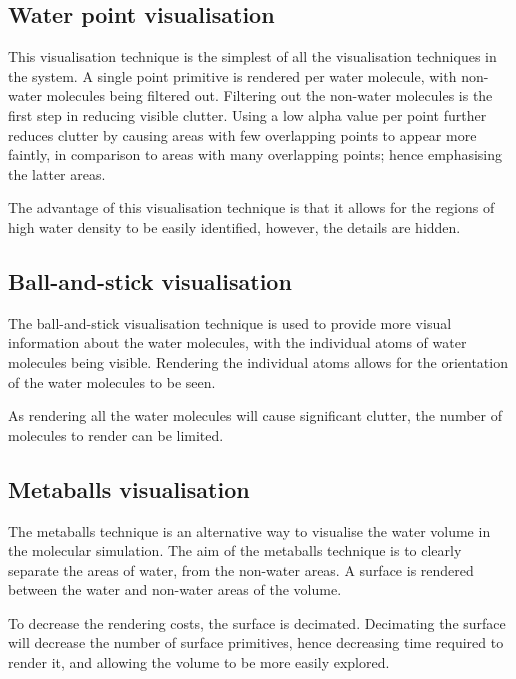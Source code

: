 
\subsection{Water point visualisation}
\label{sub:design_waterpoint}

This visualisation technique is the simplest of all the visualisation
techniques in the system. A single point primitive is rendered per water
molecule, with non-water molecules being filtered out. Filtering out the
non-water molecules is the first step in reducing visible clutter. Using a low
alpha value per point further reduces clutter by causing areas with few
overlapping points to appear more faintly, in comparison to areas with many
overlapping points; hence emphasising the latter areas.

The advantage of this visualisation technique is that it allows for the regions
of high water density to be easily identified, however, the details are hidden.


\subsection{Ball-and-stick visualisation}
\label{sub:design_ballstick}

The ball-and-stick visualisation technique is used to provide more visual
information about the water molecules, with the individual atoms of water
molecules being visible. Rendering the individual atoms allows for the
orientation of the water molecules to be seen.

As rendering all the water molecules will cause significant clutter, the number
of molecules to render can be limited.


\subsection{Metaballs visualisation}
\label{sub:design_metaballs}

The metaballs technique is an alternative way to visualise the water volume in
the molecular simulation. The aim of the metaballs technique is to clearly
separate the areas of water, from the non-water areas. A surface is rendered
between the water and non-water areas of the volume.

To decrease the rendering costs, the surface is decimated. Decimating the
surface will decrease the number of surface primitives, hence decreasing time
required to render it, and allowing the volume to be more easily explored.

